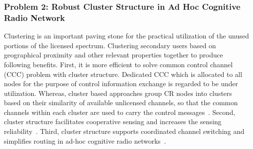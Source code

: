 





\subsubsection{Problem 2: Robust Cluster Structure in Ad Hoc Cognitive Radio Network}
Clustering is an important paving stone for the practical utilization of the unused portions of the licensed spectrum.
Clustering secondary users based on geographical proximity and other relevant properties together to produce following benefits.
First, it is more efficient to solve common control channel (\gls{CCC}) problem with cluster structure.
Dedicated CCC which is allocated to all nodes for the purpose of control information exchange is regarded to be under utilization.
Whereas, cluster based approaches group CR nodes into clusters based on their similarity of available unlicensed channels, so that the common channels within each cluster are used to carry the control messages~\cite{Lazos09}.
Second, cluster structure facilitates cooperative sensing and increases the sensing reliability~\cite{Sun07_clustering_spectrum_secsing}.
Third, cluster structure supports coordinated channel switching and simplifies routing in ad-hoc cognitive radio networks~\cite{cluster_routing_2013ICC}.

